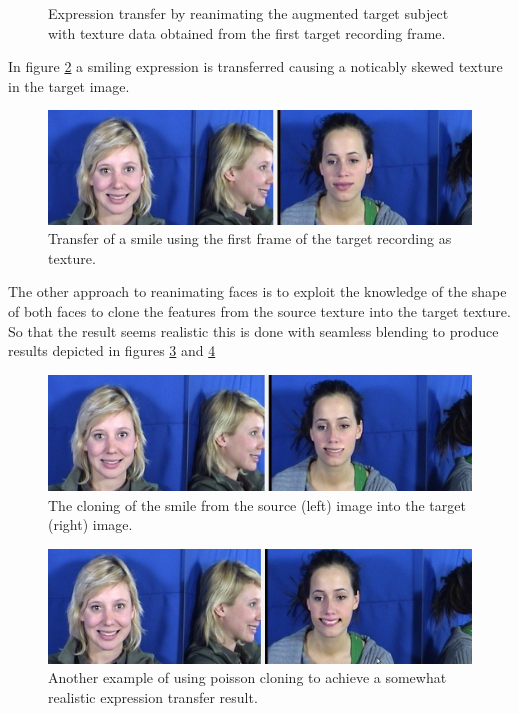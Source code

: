 \documentclass[11pt,a4paper,twoside]{report}
\begin{document}
\begin{figure}[H]
\caption{Expression transfer by reanimating the augmented target subject with
  texture data obtained from the first target recording frame.}\label{fg:transfer}
\end{figure}

In figure \ref{fg:transfer2} a smiling expression is transferred causing a
noticably skewed texture in the target image.

\begin{figure}[H]
\centering
\includegraphics[scale=0.40]{images/transfer5.png}
\caption{Transfer of a smile using the first frame of the target recording as
  texture.}\label{fg:transfer2}
\end{figure}

The other approach to reanimating faces is to exploit the knowledge of the shape of both faces to
clone the features from the source texture into the target texture. So that the
result seems realistic this is done with seamless blending to produce results
depicted in figures \ref{fg:poisson1} and \ref{fg:poisson2}
\begin{figure}[H]
\centering
\includegraphics[scale=0.40]{images/poisson6.png}
\caption{The cloning of the smile from the source (left) image into the target (right) image.}\label{fg:poisson1}
\end{figure}
\begin{figure}[H]
\centering
\includegraphics[scale=0.40]{images/poisson1.png}
\caption{Another example of using poisson cloning to achieve a somewhat realistic
  expression transfer result.}\label{fg:poisson2}
\end{figure}
 
\end{document}
